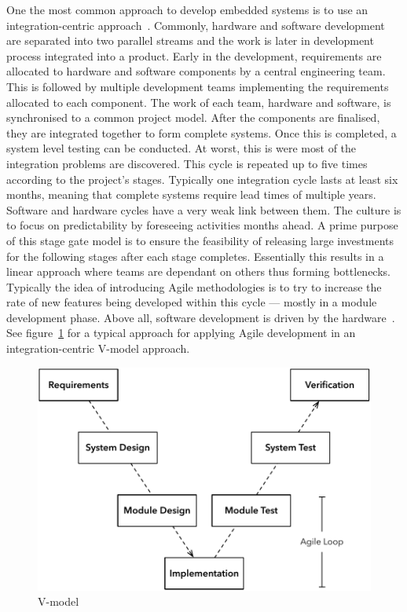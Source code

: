 \documentclass[english]{tktltiki2}
\begin{document}
One the most common approach to develop embedded systems is to use an integration-centric approach~\cite{EB12, EHS14}. Commonly, hardware and software development are separated into two parallel streams and the work is later in development process integrated into a product. Early in the development, requirements are allocated to hardware and software components by a central engineering team. This is followed by multiple development teams implementing the requirements allocated to each component. The work of each team, hardware and software, is synchronised to a common project model. After the components are finalised, they are integrated together to form complete systems. Once this is completed, a system level testing can be conducted. At worst, this is were most of the integration problems are discovered. This cycle is repeated up to five times according to the project’s stages. Typically one integration cycle lasts at least six months, meaning that complete systems require lead times of multiple years. Software and hardware cycles have a very weak link between them. The culture is to focus on predictability by foreseeing activities months ahead. A prime purpose of this stage gate model is to ensure the feasibility of releasing large investments for the following stages after each stage completes. Essentially this results in a linear approach where teams are dependant on others thus forming bottlenecks. Typically the idea of introducing Agile methodologies is to try to increase the rate of new features being developed within this cycle — mostly in a module development phase. Above all, software development is driven by the hardware~\cite{EB12}. See figure~\ref{figure:v-model} for a typical approach for applying Agile development in an integration-centric V-model approach.

\begin{figure}[h!]

    \centering
    \vspace{1cm}

    \includegraphics[scale = 0.6]{figures/v-model}

    \caption{V-model~\cite{EHS14}}
    \label{figure:v-model}

    \vspace{1cm}

\end{figure}
\end{document}
